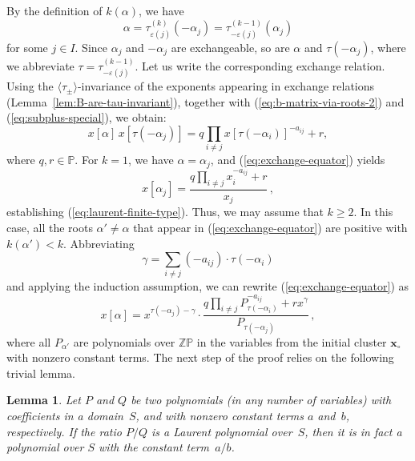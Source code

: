 \documentclass[letterpaper]{amsart}
\numberwithin{equation}{section}
\newtheorem{lemma}[theorem]{Lemma}
\theoremstyle{definition}
\def\ZZ{\mathbb{Z}}
\def\PP{\mathbb{P}}
\def\xx{\mathbf{x}}
\begin{document}
By the definition of $k(\alpha)$, we have 
$$\alpha = \tau^{(k)}_{\varepsilon (j)} (- \alpha_j) = 
\tau^{(k-1)}_{-\varepsilon (j)} (\alpha_j)$$ 
for some $j \in I$. 
Since $\alpha_j$ and $-\alpha_j$ are exchangeable, 
so are $\alpha$ and $\tau (-\alpha_j)$, 
where we abbreviate $\tau = \tau^{(k-1)}_{-\varepsilon (j)}$. 
Let us write the corresponding exchange relation. 
Using the $\langle \tau_\pm \rangle$-invariance of 
the exponents appearing in exchange relations 
(Lemma~\ref{lem:B-are-tau-invariant}), together with 
(\ref{eq:b-matrix-via-roots-2}) and (\ref{eq:subplus-special}), 
we obtain: 
\begin{equation} 
\label{eq:exchange-equator} 
x[\alpha]\, x[\tau (-\alpha_j)]= 
q \prod_{i \neq j} x[\tau (-\alpha_i)]^{-a_{ij}} + r, 
\end{equation} 
where $q,r \in \PP$. 
For $k =1$, we have $\alpha = \alpha_j$, and (\ref{eq:exchange-equator}) yields 
$$x[\alpha_j] = 
\frac{q \prod_{i \neq j} x_i^{-a_{ij}} + r}{x_j}\,,$$ 
establishing (\ref{eq:laurent-finite-type}). 
Thus, we may assume that $k \geq 2$. 
In this case, all the roots $\alpha' \neq \alpha$ that appear in 
(\ref{eq:exchange-equator}) are positive with 
$k(\alpha') < k$. 
Abbreviating 
$$\gamma = \sum_{i \neq j} (-a_{ij}) \cdot \tau(-\alpha_i)$$ 
and applying the induction assumption, we can rewrite 
(\ref{eq:exchange-equator}) as 
\begin{equation} 
\label{eq:intermediate} 
x[\alpha] = x^{\tau (-\alpha_j) - \gamma} \cdot 
\frac{q \prod_{i \neq j} P_{\tau(-\alpha_i)}^{-a_{ij}} + r x^\gamma} 
{P_{\tau(-\alpha_j)}} \, , 
\end{equation} 
where all $P_{\alpha'}$ are polynomials over $\ZZ\PP$ 
in the variables from the initial cluster 
$\xx_\circ$ with nonzero constant terms. 
The  next step of the proof relies on the following trivial lemma. 
 
\begin{lemma} 
\label{lem:laurent-implies-poly} 
Let $P$ and $Q$ be two polynomials (in any number of variables) 
with coefficients in a domain~$S$, and with nonzero constant terms $a$ and~$b$, 
respectively. If the ratio $P/Q$ is a Laurent polynomial over~$S$, then it 
is in fact a polynomial over $S$ with the constant term~$a/b$. 
\end{lemma} 
 
\end{document}
